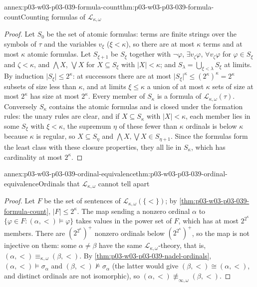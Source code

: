 \begin{annexitem}{annex:p03-w03-p03-039-formula-count}{thm:p03-w03-p03-039-formula-count}{Counting formulas of \(\mathcal L_{\kappa,\omega}\)}
\begin{proof}
Let \(S_0\) be the set of atomic formulas: terms are finite strings over the
symbols of \(\tau\) and the variables \(v_\xi\) (\(\xi<\kappa\)), so there are
at most \(\kappa\) terms and at most \(\kappa\) atomic formulas. Let
\(S_{\xi+1}\) be \(S_\xi\) together with \(\neg\varphi\), \(\exists v_\zeta\varphi\),
\(\forall v_\zeta\varphi\) for \(\varphi\in S_\xi\) and \(\zeta<\kappa\), and
\(\bigwedge X\), \(\bigvee X\) for \(X\subseteq S_\xi\) with \(\lvert X\rvert<\kappa\);
and \(S_\lambda=\bigcup_{\xi<\lambda}S_\xi\) at limits. By induction
\(\lvert S_\xi\rvert\le2^\kappa\): at successors there are at most
\(\lvert S_\xi\rvert^{\kappa}\le(2^\kappa)^\kappa=2^\kappa\) subsets of size
less than \(\kappa\), and at limits \(\xi\le\kappa\) a union of at most
\(\kappa\) sets of size at most \(2^\kappa\) has size at most \(2^\kappa\).
Every member of \(S_\kappa\) is a formula of \(\mathcal L_{\kappa,\omega}(\tau)\).
Conversely \(S_\kappa\) contains the atomic formulas and is closed under the
formation rules: the unary rules are clear, and if \(X\subseteq S_\kappa\)
with \(\lvert X\rvert<\kappa\), each member lies in some \(S_\xi\) with
\(\xi<\kappa\), the supremum \(\eta\) of these fewer than \(\kappa\) ordinals
is below \(\kappa\) because \(\kappa\) is regular, so \(X\subseteq S_\eta\)
and \(\bigwedge X,\bigvee X\in S_{\eta+1}\). Since the formulas form the least
class with these closure properties, they all lie in \(S_\kappa\), which has
cardinality at most \(2^\kappa\).
\end{proof}
\end{annexitem}

\begin{annexitem}{annex:p03-w03-p03-039-ordinal-equivalence}{thm:p03-w03-p03-039-ordinal-equivalence}{Ordinals that \(\mathcal L_{\kappa,\omega}\) cannot tell apart}
\begin{proof}
Let \(F\) be the set of sentences of \(\mathcal L_{\kappa,\omega}(\{<\})\);
by \cref{thm:p03-w03-p03-039-formula-count}, \(\lvert F\rvert\le2^\kappa\).
The map sending a nonzero ordinal \(\alpha\) to
\(\{\varphi\in F:(\alpha,<)\models\varphi\}\) takes values in the power set
of \(F\), which has at most \(2^{2^\kappa}\) members. There are
\((2^{2^\kappa})^+\) nonzero ordinals below \((2^{2^\kappa})^+\), so the map
is not injective on them: some \(\alpha\ne\beta\) have the same
\(\mathcal L_{\kappa,\omega}\)-theory, that is,
\((\alpha,<)\equiv_{\kappa,\omega}(\beta,<)\). By
\cref{thm:p03-w03-p03-039-nadel-ordinals}, \((\alpha,<)\models\sigma_\alpha\)
and \((\beta,<)\not\models\sigma_\alpha\) (the latter would give
\((\beta,<)\cong(\alpha,<)\), and distinct ordinals are not isomorphic), so
\((\alpha,<)\not\equiv_{\infty,\omega}(\beta,<)\).
\end{proof}
\end{annexitem}

